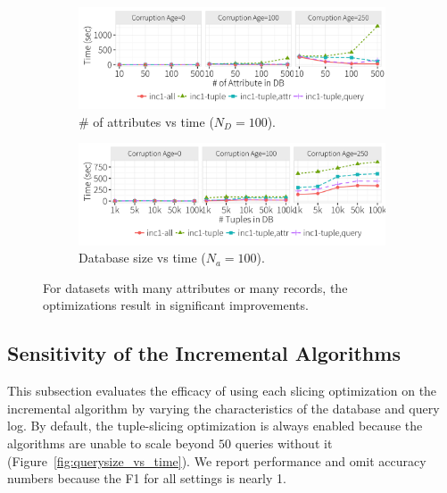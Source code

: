  \begin{figure}[!htb]
    \vspace*{-.1in}
    \centering
    \begin{subfigure}[t]{.49\textwidth}
    \includegraphics[width = .99\columnwidth]{figures/attr_time}
    \vspace*{-.1in}
    \caption{\# of attributes vs time ($N_D = 100$).}
    \label{f:attr} 
    \end{subfigure}
    \begin{subfigure}[t]{.49\textwidth}
    \includegraphics[width = .99\columnwidth]{figures/attr100_time}
    \vspace*{-.1in}
    \caption{Database size vs time ($N_a = 100$).}
    \label{f:attr100} 
    \end{subfigure}
    \vspace*{-.1in}
    \caption{For datasets with many attributes or many records, the optimizations result in significant improvements.}
    \label{f:database}
  \end{figure}

\subsection{Sensitivity of the Incremental Algorithms}
\label{sec:experiments:inc}


This subsection evaluates the efficacy of using each slicing optimization on the incremental algorithm by varying the characteristics of the database and query log.  
By default, the tuple-slicing optimization is always enabled because the algorithms are unable to scale beyond $50$ queries without it (Figure~\ref{fig:querysize_vs_time}).
We report performance and omit accuracy numbers because the F1 for all settings is nearly 1.


